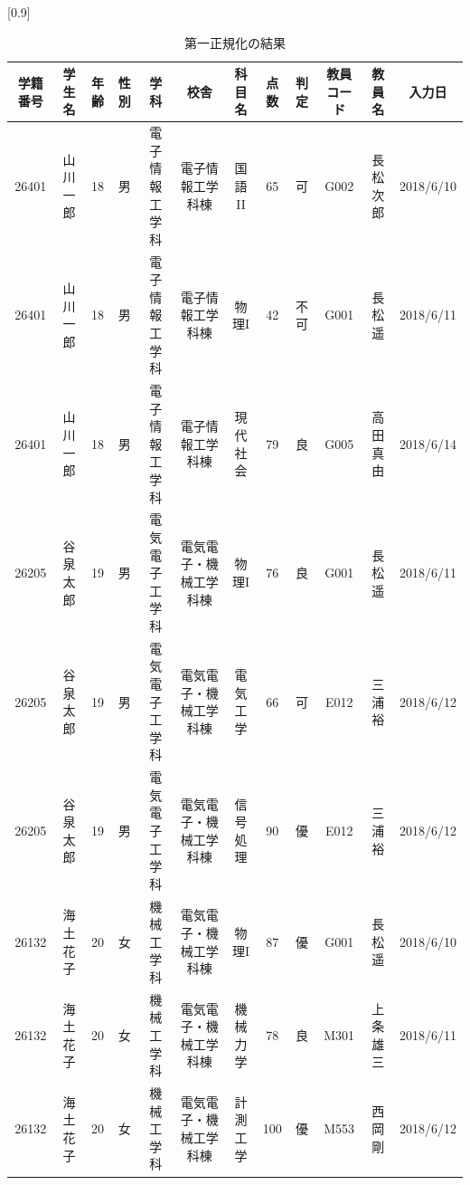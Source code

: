 \documentclass[a4j]{jarticle}
\begin{document}
    \begin{table}[H]
      \caption{第一正規化の結果}
      \label{one1}
      \begin{center}
        \scalebox{0.7}[0.9]{
        \begin{tabular}{c|c|c|c|c|c|c|c|c|c|c|c}\hline
          学籍番号 & 学生名 & 年齢 & 性別 & 学科 & 校舎 & 科目名 & 点数 & 判定 & 教員コード & 教員名 & 入力日 \\ \hline \hline
26401 & 山川一郎 & 18 & 男 & 電子情報工学科 & 電子情報工学科棟 & 国語II & 65 & 可 & G002 & 長松次郎 & 2018/6/10 \\ \hline
26401 & 山川一郎 & 18 & 男 & 電子情報工学科 & 電子情報工学科棟 & 物理I & 42 & 不可 & G001 & 長松遥 & 2018/6/11 \\ \hline
26401 & 山川一郎 & 18 & 男 & 電子情報工学科 & 電子情報工学科棟 & 現代社会 & 79 & 良 & G005 & 高田真由 & 2018/6/14 \\ \hline
26205 & 谷泉太郎 & 19 & 男 & 電気電子工学科 & 電気電子・機械工学科棟 & 物理I & 76 & 良 & G001 & 長松遥 & 2018/6/11 \\ \hline
26205 & 谷泉太郎 & 19 & 男 & 電気電子工学科 & 電気電子・機械工学科棟 & 電気工学 & 66 & 可 & E012 & 三浦裕 & 2018/6/12 \\ \hline
26205 & 谷泉太郎 & 19 & 男 & 電気電子工学科 & 電気電子・機械工学科棟 & 信号処理 & 90 & 優 & E012 & 三浦裕 & 2018/6/12 \\ \hline
26132 & 海土花子 & 20 & 女 & 機械工学科 & 電気電子・機械工学科棟 & 物理I & 87 & 優 & G001 & 長松遥 & 2018/6/10 \\ \hline
26132 & 海土花子 & 20 & 女 & 機械工学科 & 電気電子・機械工学科棟 & 機械力学 & 78 & 良 & M301 & 上条雄三 & 2018/6/11 \\ \hline
26132 & 海土花子 & 20 & 女 & 機械工学科 & 電気電子・機械工学科棟 & 計測工学 & 100 & 優 & M553 & 西岡剛 & 2018/6/12  \\ \hline
        \end{tabular}
        }
      \end{center}
      \end{table}
\end{document}
